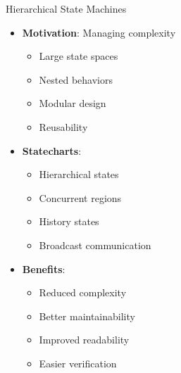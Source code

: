\documentclass[aspectratio=169,11pt]{beamer}
\newcommand{\concept}[1]{\textbf{\color{accentcolor}#1}}
\begin{document}
\begin{frame}{Hierarchical State Machines}
\begin{itemize}
\item \concept{Motivation}: Managing complexity
\begin{itemize}
\item Large state spaces
\item Nested behaviors
\item Modular design
\item Reusability
\end{itemize}
\vspace{0.5cm}
\item \concept{Statecharts}:
\begin{itemize}
\item Hierarchical states
\item Concurrent regions
\item History states
\item Broadcast communication
\end{itemize}
\vspace{0.3cm}
\item \concept{Benefits}:
\begin{itemize}
\item Reduced complexity
\item Better maintainability
\item Improved readability
\item Easier verification
\end{itemize}
\end{itemize}
\end{frame}
\end{document}
